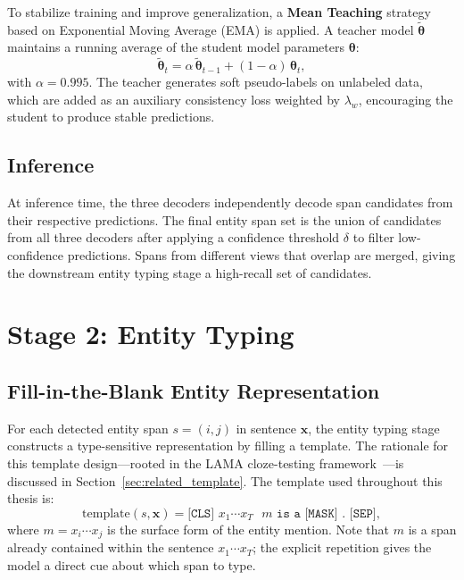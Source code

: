 \documentclass[14pt]{extreport}
\begin{document}
To stabilize training and improve generalization, a \textbf{Mean Teaching} strategy based on Exponential Moving Average (EMA) is applied. A teacher model $\tilde{\boldsymbol{\theta}}$ maintains a running average of the student model parameters $\boldsymbol{\theta}$:
\begin{equation}
    \tilde{\boldsymbol{\theta}}_t = \alpha\,\tilde{\boldsymbol{\theta}}_{t-1} + (1 - \alpha)\,\boldsymbol{\theta}_t,
    \label{eq:ema}
\end{equation}
with $\alpha = 0.995$. The teacher generates soft pseudo-labels on unlabeled data, which are added as an auxiliary consistency loss weighted by $\lambda_w$, encouraging the student to produce stable predictions.

\subsection{Inference}

At inference time, the three decoders independently decode span candidates from their respective predictions. The final entity span set is the union of candidates from all three decoders after applying a confidence threshold $\delta$ to filter low-confidence predictions. Spans from different views that overlap are merged, giving the downstream entity typing stage a high-recall set of candidates.


\section{Stage 2: Entity Typing}

\subsection{Fill-in-the-Blank Entity Representation}

For each detected entity span $s = (i, j)$ in sentence $\mathbf{x}$, the entity typing stage constructs a type-sensitive representation by filling a template. The rationale for this template design---rooted in the LAMA cloze-testing framework~\cite{petroni-etal-2019-language}---is discussed in Section~\ref{sec:related_template}. The template used throughout this thesis is:
\begin{equation}
    \text{template}(s, \mathbf{x}) = \texttt{[CLS] } x_1 \cdots x_T \texttt{ } m \texttt{ is a [MASK] . [SEP]},
    \label{eq:template}
\end{equation}
where $m = x_i \cdots x_j$ is the surface form of the entity mention. Note that $m$ is a span already contained within the sentence $x_1 \cdots x_T$; the explicit repetition gives the model a direct cue about which span to type.
\end{document}
